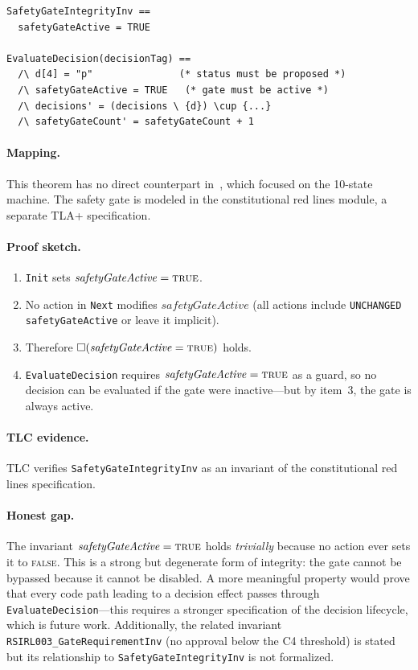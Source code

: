 \documentclass[11pt]{article}
\begin{document}
\begin{lstlisting}
SafetyGateIntegrityInv ==
  safetyGateActive = TRUE

EvaluateDecision(decisionTag) ==
  /\ d[4] = "p"               (* status must be proposed *)
  /\ safetyGateActive = TRUE   (* gate must be active *)
  /\ decisions' = (decisions \ {d}) \cup {...}
  /\ safetyGateCount' = safetyGateCount + 1
\end{lstlisting}

\paragraph{Mapping.} This theorem has no direct counterpart in~\cite{maref-w3},
which focused on the 10-state machine. The safety gate is modeled in the
constitutional red lines module, a separate TLA+ specification.

\paragraph{Proof sketch.}
\begin{enumerate}
  \item \texttt{Init} sets $\mathit{safetyGateActive} = \textsc{true}$.
  \item No action in \texttt{Next} modifies $\mathit{safetyGateActive}$ (all
    actions include \texttt{UNCHANGED safetyGateActive} or leave it implicit).
  \item Therefore $\Box(\mathit{safetyGateActive} = \textsc{true})$ holds.
  \item \texttt{EvaluateDecision} requires $\mathit{safetyGateActive} =
    \textsc{true}$ as a guard, so no decision can be evaluated if the gate
    were inactive---but by item~3, the gate is always active.
\end{enumerate}

\paragraph{TLC evidence.} TLC verifies \texttt{SafetyGateIntegrityInv} as an
invariant of the constitutional red lines specification.

\paragraph{Honest gap.} The invariant $\mathit{safetyGateActive} =
\textsc{true}$ holds \emph{trivially} because no action ever sets it to
\textsc{false}. This is a strong but degenerate form of integrity: the gate
cannot be bypassed because it cannot be disabled. A more meaningful property
would prove that every code path leading to a decision effect passes through
\texttt{EvaluateDecision}---this requires a stronger specification of the
decision lifecycle, which is future work. Additionally, the related invariant
\texttt{RSIRL003\_GateRequirementInv} (no approval below the C4 threshold) is
stated but its relationship to \texttt{SafetyGateIntegrityInv} is not
formalized.
\end{document}
